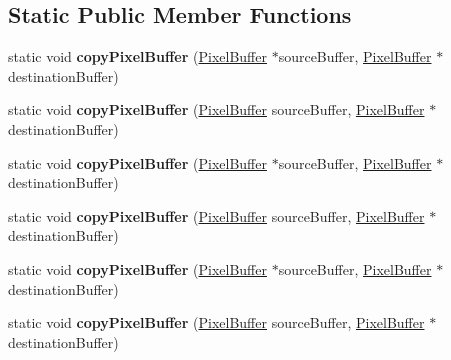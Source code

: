 \subsection*{Static Public Member Functions}
\begin{DoxyCompactItemize}
\item 
\hypertarget{classPixelBuffer_afedcf4028903278e8eacbd78d11232ee}{static void {\bfseries copy\-Pixel\-Buffer} (\hyperlink{classPixelBuffer}{Pixel\-Buffer} $\ast$source\-Buffer, \hyperlink{classPixelBuffer}{Pixel\-Buffer} $\ast$destination\-Buffer)}\label{classPixelBuffer_afedcf4028903278e8eacbd78d11232ee}

\item 
\hypertarget{classPixelBuffer_a91bfa4c461b467c0504601a7bc6e29b2}{static void {\bfseries copy\-Pixel\-Buffer} (\hyperlink{classPixelBuffer}{Pixel\-Buffer} source\-Buffer, \hyperlink{classPixelBuffer}{Pixel\-Buffer} $\ast$destination\-Buffer)}\label{classPixelBuffer_a91bfa4c461b467c0504601a7bc6e29b2}

\item 
\hypertarget{classPixelBuffer_ab7c83e71cb94b2b82325c3c3e152ca7b}{static void {\bfseries copy\-Pixel\-Buffer} (\hyperlink{classPixelBuffer}{Pixel\-Buffer} $\ast$source\-Buffer, \hyperlink{classPixelBuffer}{Pixel\-Buffer} $\ast$destination\-Buffer)}\label{classPixelBuffer_ab7c83e71cb94b2b82325c3c3e152ca7b}

\item 
\hypertarget{classPixelBuffer_a91bfa4c461b467c0504601a7bc6e29b2}{static void {\bfseries copy\-Pixel\-Buffer} (\hyperlink{classPixelBuffer}{Pixel\-Buffer} source\-Buffer, \hyperlink{classPixelBuffer}{Pixel\-Buffer} $\ast$destination\-Buffer)}\label{classPixelBuffer_a91bfa4c461b467c0504601a7bc6e29b2}

\item 
\hypertarget{classPixelBuffer_ab7c83e71cb94b2b82325c3c3e152ca7b}{static void {\bfseries copy\-Pixel\-Buffer} (\hyperlink{classPixelBuffer}{Pixel\-Buffer} $\ast$source\-Buffer, \hyperlink{classPixelBuffer}{Pixel\-Buffer} $\ast$destination\-Buffer)}\label{classPixelBuffer_ab7c83e71cb94b2b82325c3c3e152ca7b}

\item 
\hypertarget{classPixelBuffer_a91bfa4c461b467c0504601a7bc6e29b2}{static void {\bfseries copy\-Pixel\-Buffer} (\hyperlink{classPixelBuffer}{Pixel\-Buffer} source\-Buffer, \hyperlink{classPixelBuffer}{Pixel\-Buffer} $\ast$destination\-Buffer)}\label{classPixelBuffer_a91bfa4c461b467c0504601a7bc6e29b2}

\end{DoxyCompactItemize}


